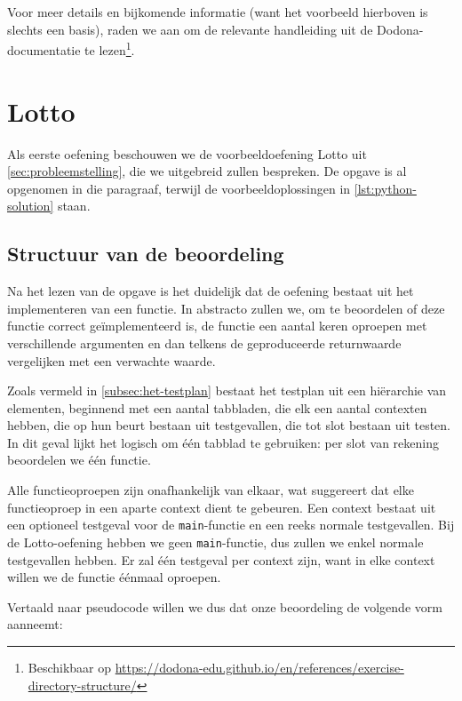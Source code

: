 \inputminted{text}{code/dirs-exercise.txt}

Voor meer details en bijkomende informatie (want het voorbeeld hierboven is slechts een basis), raden we aan om de relevante handleiding uit de Dodona-documentatie te lezen\footnote{Beschikbaar op \url{https://dodona-edu.github.io/en/references/exercise-directory-structure/}}.

\section{Lotto}\label{sec:oefening-lotto}

Als eerste oefening beschouwen we de voorbeeldoefening Lotto uit \cref{sec:probleemstelling}, die we uitgebreid zullen bespreken.
De opgave is al opgenomen in die paragraaf, terwijl de voorbeeldoplossingen in \cref{lst:python-solution} staan.

\subsection{Structuur van de beoordeling}\label{subsec:oefening-lotto-structuur}

Na het lezen van de opgave is het duidelijk dat de oefening bestaat uit het implementeren van een functie.
In abstracto zullen we, om te beoordelen of deze functie correct geïmplementeerd is, de functie een aantal keren oproepen met verschillende argumenten en dan telkens de geproduceerde returnwaarde vergelijken met een verwachte waarde.

Zoals vermeld in \cref{subsec:het-testplan} bestaat het testplan uit een hiërarchie van elementen, beginnend met een aantal tabbladen, die elk een aantal contexten hebben, die op hun beurt bestaan uit testgevallen, die tot slot bestaan uit testen.
In dit geval lijkt het logisch om één tabblad te gebruiken: per slot van rekening beoordelen we één functie.

Alle functieoproepen zijn onafhankelijk van elkaar, wat suggereert dat elke functieoproep in een aparte context dient te gebeuren.
Een context bestaat uit een optioneel testgeval voor de \texttt{main}-functie en een reeks normale testgevallen.
Bij de Lotto-oefening hebben we geen \texttt{main}-functie, dus zullen we enkel normale testgevallen hebben.
Er zal één testgeval per context zijn, want in elke context willen we de functie éénmaal oproepen.

Vertaald naar pseudocode willen we dus dat onze beoordeling de volgende vorm aanneemt:


